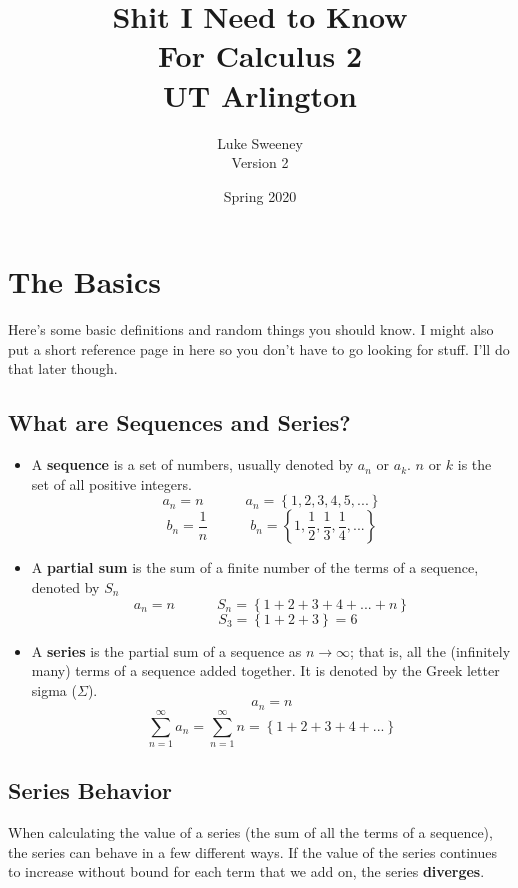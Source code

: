 \documentclass[12pt]{report}
\author{Luke Sweeney \\ \large Version 2}
\title{\textbf{Shit I Need to Know} \\ For Calculus 2 \\ UT Arlington}
\date{Spring 2020}
\begin{document}
\maketitle
\tableofcontents

\chapter{The Basics}
Here's some basic definitions and random things you should know. I might also put a short reference page in here so you don't have to go looking for stuff. I'll do that later though. 

\section{What are Sequences and Series?}

\begin{itemize}
	\item[] A \textbf{sequence} is a set of numbers, usually denoted by $a_n$ or $a_k$. $n$ or $k$ is the set of all positive integers.
		$$ a_n = n \quad \quad \quad a_n = \left\{ 1, 2, 3, 4, 5, ... \right\} $$
		$$ b_n = \frac{1}{n} \quad \quad \quad b_n = \left\{ 1, \frac{1}{2}, \frac{1}{3}, \frac{1}{4}, ... \right\} $$
		
		
	
	\item[] A \textbf{partial sum} is the sum of a finite number of the terms of a sequence, denoted by $S_n$
		$$ a_n = n \quad \quad \quad S_n = \left\{1 + 2 + 3 + 4 + ... + n\right\} $$
		$$ \quad \quad \; S_3 = \left\{ 1 + 2 + 3 \right\} = 6 $$
		
		
	\item[] A \textbf{series} is the partial sum of a sequence as $n\to\infty$; that is, all the (infinitely many) terms of a sequence added together. It is denoted by the Greek letter sigma ($\Sigma$).
		$$ a_n = n $$
		$$ \sum_{n=1}^{\infty} a_n = \sum_{n=1}^{\infty} n = \left\{ 1 + 2 + 3 + 4 + ... \right\}$$
\end{itemize}

\section{Series Behavior}
When calculating the value of a series (the sum of all the terms of a sequence), the series can behave in a few different ways. If the value of the series continues to increase without bound for each term that we add on, the series \textbf{diverges}.
\end{document}
